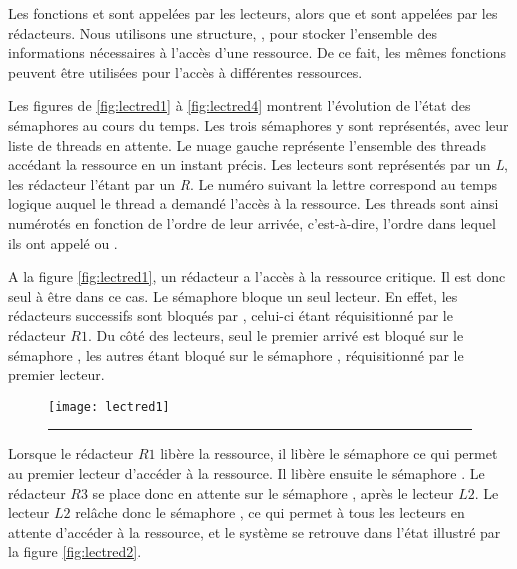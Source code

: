 Les fonctions  et  sont appelées par les lecteurs, alors que  et  sont appelées par les rédacteurs. Nous utilisons une structure, , pour stocker l'ensemble des informations nécessaires à l'accès d'une ressource. De ce fait, les mêmes fonctions peuvent être utilisées pour l'accès à différentes ressources.

Les figures de \ref{fig:lectred1} à \ref{fig:lectred4} montrent l'évolution de l'état des sémaphores au cours du temps. Les trois sémaphores y sont représentés, avec leur liste de threads en attente. Le nuage gauche représente l'ensemble des threads accédant la ressource en un instant précis. Les lecteurs sont représentés par un \emph{L}, les rédacteur l'étant par un \emph{R}. Le numéro suivant la lettre correspond au temps logique auquel le thread a demandé l'accès à la ressource. Les threads sont ainsi numérotés en fonction de l'ordre de leur arrivée, c'est-à-dire, l'ordre dans lequel ils ont appelé  ou .

A la figure \ref{fig:lectred1}, un rédacteur a l'accès à la ressource critique. Il est donc seul à être dans ce cas. Le sémaphore  bloque un seul lecteur. En effet, les rédacteurs successifs sont bloqués par , celui-ci étant réquisitionné par le rédacteur $R1$. Du côté des lecteurs, seul le premier arrivé est bloqué sur le sémaphore , les autres étant bloqué sur le sémaphore , réquisitionné par le premier lecteur.

\begin{figure}[!ht]
\begin{center}
\texttt{[image: lectred1]}
\end{center}
\vspace{-.3cm}
\rule{\textwidth}{0.01in}
\end{figure}

Lorsque le rédacteur $R1$ libère la ressource, il libère le sémaphore  ce qui permet au premier lecteur d'accéder à la ressource.
Il libère ensuite le sémaphore . Le rédacteur $R3$ se place donc en attente sur le sémaphore , après le lecteur $L2$.
Le lecteur $L2$ relâche donc le sémaphore , ce qui permet à tous les lecteurs en attente d'accéder à la ressource, et le système se retrouve dans l'état illustré par la figure \ref{fig:lectred2}.

